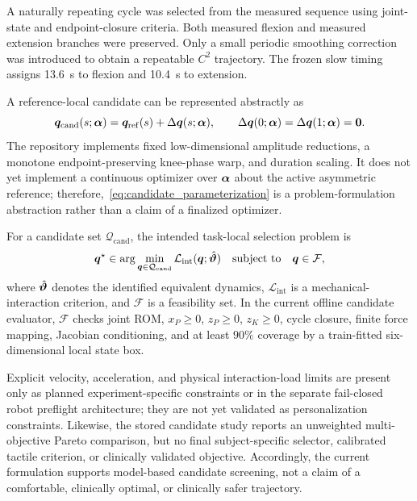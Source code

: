A naturally repeating cycle was selected from the measured sequence using
joint-state and endpoint-closure criteria.  Both measured flexion and measured
extension branches were preserved.  Only a small periodic smoothing
correction was introduced to obtain a repeatable $C^2$ trajectory.  The frozen
slow timing assigns \SI{13.6}{s} to flexion and \SI{10.4}{s} to extension.

A reference-local candidate can be represented abstractly as
\begin{equation}
    \bm{q}_{\mathrm{cand}}(s;\bm{\alpha})
    =\bm{q}_{\mathrm{ref}}(s)
    +\Delta\bm{q}(s;\bm{\alpha}),
    \qquad
    \Delta\bm{q}(0;\bm{\alpha})
    =\Delta\bm{q}(1;\bm{\alpha})=\bm{0}.
    \label{eq:candidate_parameterization}
\end{equation}
The repository implements fixed low-dimensional amplitude reductions, a
monotone endpoint-preserving knee-phase warp, and duration scaling.  It does
not yet implement a continuous optimizer over $\bm{\alpha}$ about the active
asymmetric reference; therefore,~\eqref{eq:candidate_parameterization} is a
problem-formulation abstraction rather than a claim of a finalized optimizer.

For a candidate set $\mathcal{Q}_{\mathrm{cand}}$, the intended task-local
selection problem is
\begin{equation}
    \bm{q}^{\star}\in
    \arg\min_{\bm{q}\in\mathcal{Q}_{\mathrm{cand}}}
    \mathcal{L}_{\mathrm{int}}(\bm{q};\hat{\bm{\vartheta}})
    \quad\text{subject to}\quad
    \bm{q}\in\mathcal{F},
    \label{eq:personalization_problem}
\end{equation}
where $\hat{\bm{\vartheta}}$ denotes the identified equivalent dynamics,
$\mathcal{L}_{\mathrm{int}}$ is a mechanical-interaction criterion, and
$\mathcal{F}$ is a feasibility set.  In the current offline candidate evaluator,
$\mathcal{F}$ checks joint ROM, $x_P\geq0$, $z_P\geq0$, $z_K\geq0$, cycle
closure, finite force mapping, Jacobian conditioning, and at least $90\%$
coverage by a train-fitted six-dimensional local state box.

Explicit velocity, acceleration, and physical interaction-load limits are
present only as planned experiment-specific constraints or in the separate
fail-closed robot preflight architecture; they are not yet validated as
personalization constraints.  Likewise, the stored candidate study reports an
unweighted multi-objective Pareto comparison, but no final subject-specific
selector, calibrated tactile criterion, or clinically validated objective.
Accordingly, the current formulation supports model-based candidate screening,
not a claim of a comfortable, clinically optimal, or clinically safer
trajectory.
